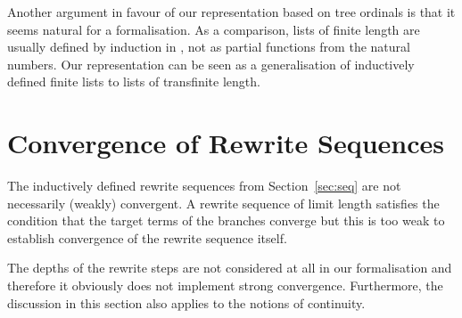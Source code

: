Another argument in favour of our representation based on tree
ordinals is that it seems natural for a \Coq formalisation. As a
comparison, lists of finite length are usually defined by induction in
\Coq, not as partial functions from the natural numbers. Our
representation can be seen as a generalisation of inductively defined
finite lists to lists of transfinite length.


\section{Convergence of Rewrite Sequences}\label{sec:convergence}

The inductively defined rewrite sequences from Section~\ref{sec:seq}
are not necessarily (weakly) convergent. A rewrite sequence of limit
length satisfies the condition that the target terms of the
 branches converge but
this is too weak to establish convergence of the rewrite
sequence itself.

The depths of the rewrite steps are not considered at all in our
formalisation and therefore it obviously does not implement strong
convergence. Furthermore, the discussion in this section also applies
to the notions of continuity.

